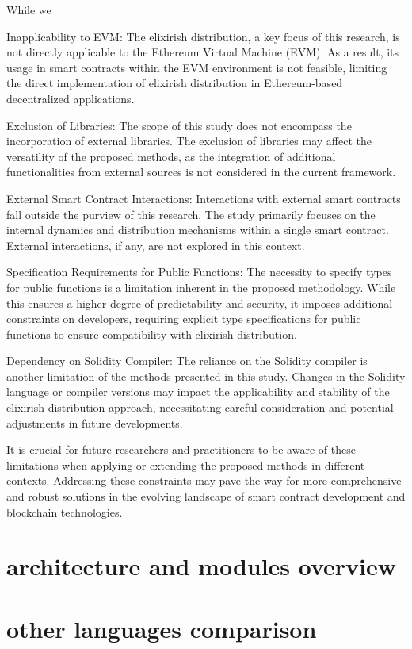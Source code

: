 While we 

Inapplicability to EVM:
The elixirish distribution, a key focus of this research, is not directly applicable to the Ethereum Virtual Machine (EVM). As a result, its usage in smart contracts within the EVM environment is not feasible, limiting the direct implementation of elixirish distribution in Ethereum-based decentralized applications.

Exclusion of Libraries:
The scope of this study does not encompass the incorporation of external libraries. The exclusion of libraries may affect the versatility of the proposed methods, as the integration of additional functionalities from external sources is not considered in the current framework.

External Smart Contract Interactions:
Interactions with external smart contracts fall outside the purview of this research. The study primarily focuses on the internal dynamics and distribution mechanisms within a single smart contract. External interactions, if any, are not explored in this context.

Specification Requirements for Public Functions:
The necessity to specify types for public functions is a limitation inherent in the proposed methodology. While this ensures a higher degree of predictability and security, it imposes additional constraints on developers, requiring explicit type specifications for public functions to ensure compatibility with elixirish distribution.

Dependency on Solidity Compiler:
The reliance on the Solidity compiler is another limitation of the methods presented in this study. Changes in the Solidity language or compiler versions may impact the applicability and stability of the elixirish distribution approach, necessitating careful consideration and potential adjustments in future developments.

It is crucial for future researchers and practitioners to be aware of these limitations when applying or extending the proposed methods in different contexts. Addressing these constraints may pave the way for more comprehensive and robust solutions in the evolving landscape of smart contract development and blockchain technologies.

\section{architecture and modules overview}
\label{}

\section{other languages comparison}
\label{}

